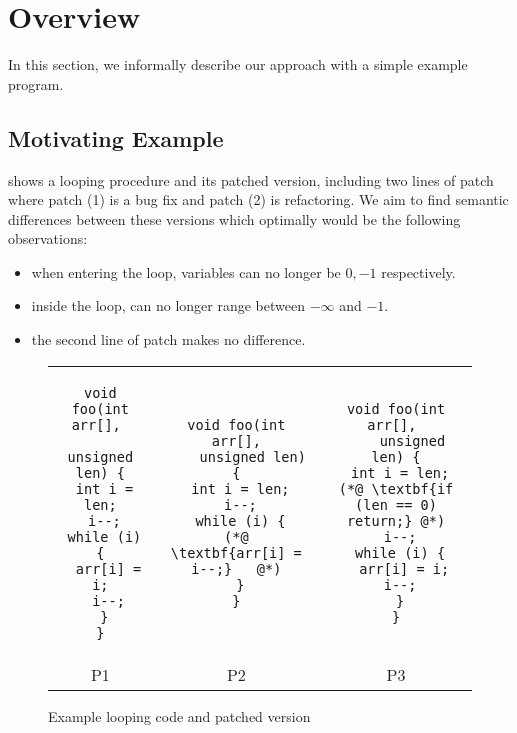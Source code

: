 \section{Overview} 

In this section, we informally describe our approach with a simple example program.

\subsection{Motivating Example}

 shows a looping procedure and its patched version, including two lines of patch where patch (1) is a bug fix and patch (2) is refactoring. We aim to find semantic differences between these versions which optimally would be the following observations:
\begin{itemize}
\item when entering the loop, variables  can no longer be $0,-1$ respectively. \item inside the loop,  can no longer range between $-\infty$ and $-1$. \item the second line of patch makes no difference.
\end{itemize}

\begin{figure*}
\centering
\begin{tabular}{ccc}
\begin{lstlisting}
void foo(int arr[], 
    unsigned len) {
 int i = len;
 i--;
 while (i) {
  arr[i] = i;
  i--;
 }
}
\end{lstlisting}
&
\begin{lstlisting}
void foo(int arr[],
    unsigned len) {
 int i = len;
 i--;
 while (i) {
(*@  \textbf{arr[i] = i--;}   @*)
 }
}
\end{lstlisting}
&
\begin{lstlisting}
void foo(int arr[], 
    unsigned len) {
 int i = len;
(*@ \textbf{if (len == 0) return;} @*)
 i--;
 while (i) {
  arr[i] = i;
  i--; 
 }
}
\end{lstlisting}
\\
\small{P1} & \small{P2} & \small{P3} \\
\end{tabular}
\caption{Example looping code and patched version}
\end{figure*}

